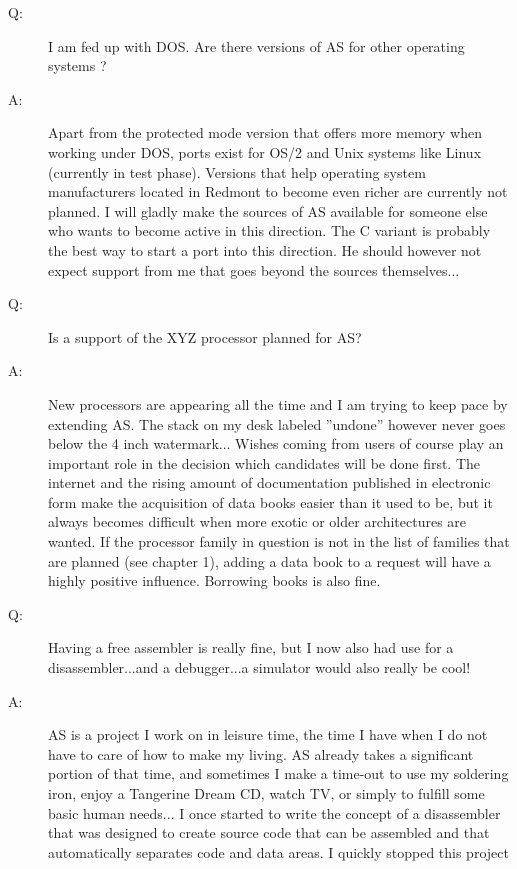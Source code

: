 \documentclass[12pt,twoside]{report}
\newcommand{\asname}{{AS}}
\begin{document}
\begin{description}
\item[Q:]{I am fed up with DOS.  Are there versions of \asname{} for other
   operating systems ?}
\item[A:]{Apart from the protected mode version that offers more memory when
   working under DOS, ports exist for OS/2 and Unix systems like
   Linux (currently in test phase).  Versions that help operating
   system manufacturers located in Redmont to become even richer are
   currently not planned.  I will gladly make the sources of \asname{}
   available for someone else who wants to become active in this
   direction.  The C variant is probably the best way to start a
   port into this direction.  He should however not expect support
   from me that goes beyond the sources themselves...}
\vspace{0.3cm}
\item[Q:]{Is a support of the XYZ processor planned for \asname{}?}
\item[A:]{New processors are appearing all the time and I am trying to keep
   pace by extending \asname{}.  The stack on my desk labeled ''undone''
   however never goes below the 4 inch watermark... Wishes coming
   from users of course play an important role in the decision which
   candidates will be done first.  The internet and the rising amount
   of documentation published in electronic form make the acquisition
   of data books easier than it used to be, but it always becomes
   difficult when more exotic or older architectures are wanted.  If
   the processor family in question is not in the list of families
   that are planned (see chapter 1), adding a data book to a request
   will have a highly positive influence.  Borrowing books is also
   fine.}
\vspace{0.3cm}
\item[Q:]{Having a free assembler is really fine, but I now also had use for
   a disassembler...and a debugger...a simulator would also really be
   cool!}
\item[A:]{\asname{} is a project I work on in leisure time, the time I have when I
   do not have to care of how to make my living.  \asname{} already takes a
   significant portion of that time, and sometimes I make a time-out
   to use my soldering iron, enjoy a Tangerine Dream CD, watch TV, or
   simply to fulfill some basic human needs... I once started to
   write the concept of a disassembler that was designed to create
   source code that can be assembled and that automatically
   separates code and data areas.  I quickly stopped this project
}
\end{description}
\end{document}
